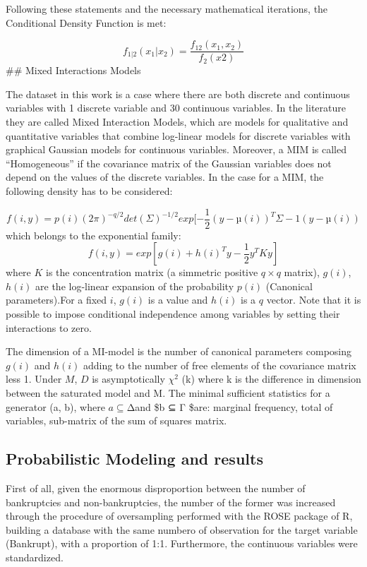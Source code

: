 \documentclass[
]{article}
\begin{document}
Following these statements and the necessary mathematical iterations,
the Conditional Density Function is met:

\[f_{1|2}(x_1|x_2) = \frac{f_{12}(x_1, x_2)}{f_2(x2)}\] \#\# Mixed
Interactions Models

The dataset in this work is a case where there are both discrete and
continuous variables with 1 discrete variable and 30 continuous
variables. In the literature they are called Mixed Interaction Models,
which are models for qualitative and quantitative variables that combine
log-linear models for discrete variables with graphical Gaussian models
for continuous variables. Moreover, a MIM is called ``Homogeneous'' if
the covariance matrix of the Gaussian variables does not depend on the
values of the discrete variables. In the case for a MIM, the following
density has to be considered:

\[f(i, y) = p(i)(2π)^{−q/2} det(Σ)^{−1/2}exp[-\frac{1}{2}(y − µ(i))^T Σ−1(y − µ(i))\]
which belongs to the exponential family:
\[f(i, y) = exp[g(i) + h(i)^T y −\frac{1}{2}y^T Ky]\] where \(K\) is the
concentration matrix (a simmetric positive \(q × q\) matrix), \(g(i)\),
\(h(i)\) are the log-linear expansion of the probability \(p(i)\)
(Canonical parameters).For a fixed \(i\), \(g(i)\) is a value and
\(h(i)\) is a \(q\) vector. Note that it is possible to impose
conditional independence among variables by setting their interactions
to zero.

The dimension of a MI-model is the number of canonical parameters
composing \(g(i)\) and \(h(i)\) adding to the number of free elements of
the covariance matrix less 1. Under \(M\), \(D\) is asymptotically
\(χ^2\) (k) where k is the difference in dimension between the saturated
model and M. The minimal sufficient statistics for a generator (a, b),
where \(a ⊆ ∆\)and \$b ⊆ Γ \$are: marginal frequency, total of
variables, sub-matrix of the sum of squares matrix.

\hypertarget{probabilistic-modeling-and-results}{%
\subsection{Probabilistic Modeling and
results}\label{probabilistic-modeling-and-results}}

First of all, given the enormous disproportion between the number of
bankruptcies and non-bankruptcies, the number of the former was
increased through the procedure of oversampling performed with the ROSE
package of R, building a database with the same numbero of observation
for the target variable (Bankrupt), with a proportion of 1:1.
Furthermore, the continuous variables were standardized.
\end{document}
